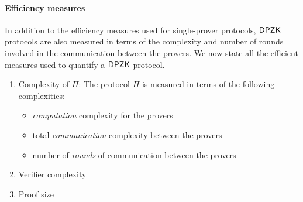 \paragraph{Efficiency measures}
In addition to the efficiency measures used for single-prover protocols, $\mathsf{DPZK}$ protocols are also measured in terms of the complexity and number of rounds involved in the communication between the provers. We now state all the efficient measures used to quantify a $\mathsf{DPZK}$ protocol.
\begin{enumerate}
\item Complexity of $\Pi$: The protocol $\Pi$ is measured in terms of the following complexities:
\begin{itemize}
\item \textit{computation} complexity for the provers
\item total \textit{communication} complexity between the provers
\item number of \textit{rounds} of communication between the provers
\end{itemize}
\item Verifier complexity
\item Proof size
\end{enumerate}

